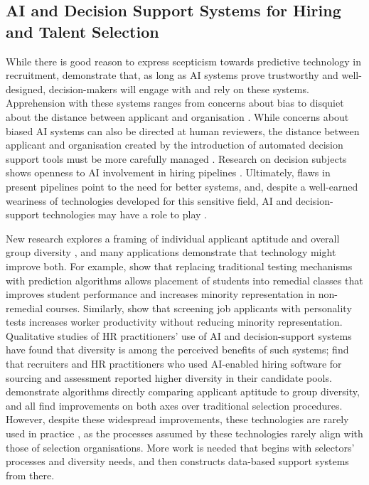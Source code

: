\subsection{AI and Decision Support Systems for Hiring and Talent Selection}
While there is good reason to express scepticism towards predictive technology in recruitment, \textcite{Vereschak_Alizadeh_Bailly_Caramiaux_2024} demonstrate that, as long as AI systems prove trustworthy and well-designed, decision-makers will engage with and rely on these systems. Apprehension with these systems ranges from concerns about bias to disquiet about the distance between applicant and organisation \cite{Lashkari_Cheng_2023}. While concerns about biased AI systems can also be directed at human reviewers, the distance between applicant and organisation created by the introduction of automated decision support tools must be more carefully managed \cite{Leung_Zhang_Jibuti_Zhao_Klein_Pierce_Robert_Zhu_2020,Lashkari_Cheng_2023}. Research on decision subjects shows openness to AI involvement in hiring pipelines \cite{horodyski_applicants_2023}. Ultimately, flaws in present pipelines point to the need for better systems, and, despite a well-earned weariness of technologies developed for this sensitive field, AI and decision-support technologies may have a role to play \cite{kleinberg2018algorithmic,Vereschak_Alizadeh_Bailly_Caramiaux_2024,barocas2023fairness,huppenkothen2020entrofy,schumann2017diverse}.

New research explores a framing of individual applicant aptitude and overall group diversity \cite{noray2023systemic}, and many applications demonstrate that technology might improve both. For example, \textcite{bergman2021seven} show that replacing traditional testing mechanisms with prediction algorithms allows placement of students into remedial classes that improves student performance and increases minority representation in non-remedial courses. Similarly, \textcite{autor2008does} show that screening job applicants with personality tests increases worker productivity without reducing minority representation. Qualitative studies of HR practitioners' use of AI and decision-support systems have found that diversity is among the perceived benefits of such systems; \textcite{li2021algorithmic} find that recruiters and HR practitioners who used AI-enabled hiring software for sourcing and assessment reported higher diversity in their candidate pools.  \textcite{huppenkothen2020entrofy,kleinberg2018algorithmic,schumann2017diverse} demonstrate algorithms directly comparing applicant aptitude to group diversity, and all find improvements on both axes over traditional selection procedures. However, despite these widespread improvements, these technologies are rarely used in practice \cite{page_diversity_2017}, as the processes assumed by these technologies rarely align with those of selection organisations. More work is needed that begins with selectors' processes and diversity needs, and then constructs data-based support systems from there.

